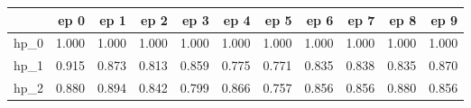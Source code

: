 \begin{tabular}{lrrrrrrrrrr}
\toprule
{} &   ep 0 &   ep 1 &   ep 2 &   ep 3 &   ep 4 &   ep 5 &   ep 6 &   ep 7 &   ep 8 &   ep 9 \\
\midrule
hp\_0 &  1.000 &  1.000 &  1.000 &  1.000 &  1.000 &  1.000 &  1.000 &  1.000 &  1.000 &  1.000 \\
hp\_1 &  0.915 &  0.873 &  0.813 &  0.859 &  0.775 &  0.771 &  0.835 &  0.838 &  0.835 &  0.870 \\
hp\_2 &  0.880 &  0.894 &  0.842 &  0.799 &  0.866 &  0.757 &  0.856 &  0.856 &  0.880 &  0.856 \\
\bottomrule
\end{tabular}
